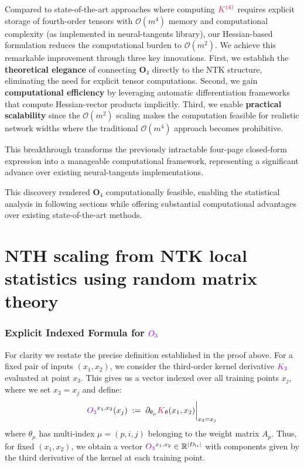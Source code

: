 \documentclass[a4paper]{article}
\theoremstyle{plain}
\theoremstyle{definition}
\theoremstyle{remark}
\begin{document}
\begin{tcolorbox}[colback=green!10,colframe=green!60!black,title={\textbf{🔍 COMPUTATIONAL BREAKTHROUGH: From $m^4$ to $m^2$ complexity}},enhanced,drop shadow]
Compared to state-of-the-art approaches where computing $\textcolor{kernelcolor}{K^{(4)}}$ requires explicit storage of fourth-order tensors with $\mathcal{O}(m^4)$ memory and computational complexity (as implemented in neural-tangents library), our Hessian-based formulation reduces the computational burden to $\mathcal{O}(m^2)$. We achieve this remarkable improvement through three key innovations. First, we establish the \textbf{theoretical elegance} of connecting $\mathbf{O}_4$ directly to the NTK structure, eliminating the need for explicit tensor computations. Second, we gain \textbf{computational efficiency} by leveraging automatic differentiation frameworks that compute Hessian-vector products implicitly. Third, we enable \textbf{practical scalability} since the $\mathcal{O}(m^2)$ scaling makes the computation feasible for realistic network widths where the traditional $\mathcal{O}(m^4)$ approach becomes prohibitive.

This breakthrough transforms the previously intractable four-page closed-form expression into a manageable computational framework, representing a significant advance over existing neural-tangents implementations.
\end{tcolorbox}

This discovery rendered $\mathbf{O}_4$ computationally feasible, enabling the statistical analysis in following sections while offering substantial computational advantages over existing state-of-the-art methods.




\newpage
\section{NTH scaling from NTK local statistics using random matrix theory}


\subsubsection{Explicit Indexed Formula for $\textcolor{k3color}{O_3}$}
For clarity we restate the precise definition established in the proof above.  
For a fixed pair of inputs $(x_1, x_2)$, we consider the third-order kernel derivative $\textcolor{k3color}{K_3}$ evaluated at point $x_3$. This gives us a vector indexed over all training points $x_j$, where we set $x_3 = x_j$ and define:
\[
  \textcolor{k3color}{O_3}^{x_1,x_2}(x_j)\;:=\;\partial_{\theta_{\mu}}\textcolor{kernelcolor}{K}_{\theta}(x_1,x_2)\bigg|_{x_3=x_j}
\]
where $\theta_{\mu}$ has multi-index $\mu=(p,i,j)$ belonging to the weight matrix $A_p$. Thus, for fixed $(x_1,x_2)$, we obtain a vector $\textcolor{k3color}{O_3}^{x_1,x_2} \in \mathbb{R}^{|D_{\text{tr}}|}$ with components given by the third derivative of the kernel at each training point.
\end{document}

